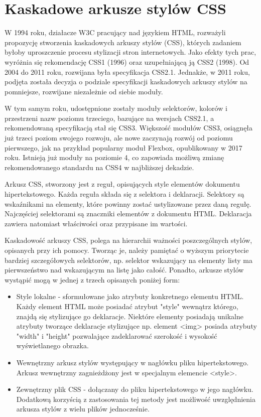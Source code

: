 \section{Kaskadowe arkusze stylów CSS}

W 1994 roku, działacze W3C pracujący nad językiem HTML, rozważyli propozycję stworzenia kaskadowych arkuszy stylów (CSS), których zadaniem byłoby uproszczenie procesu stylizacji stron internetowych. Jako efekty tych prac, wyróżnia się rekomendację CSS1 (1996) oraz uzupełniającą ją CSS2 (1998). Od 2004 do 2011 roku, rozwijana była specyfikacja CSS2.1. Jednakże, w 2011 roku, podjęta została decyzja o podziale specyfikacji kaskadowych arkuszy stylów na pomniejsze, rozwijane niezależnie od siebie moduły.

W tym samym roku, udostępnione zostały moduły selektorów, kolorów i przestrzeni nazw poziomu trzeciego, bazujące na wersjach CSS2.1, a rekomendowaną specyfikacją stał się CSS3. Większość modułów CSS3, osiągnęła już trzeci poziom swojego rozwoju, ale nowe zaczynają rozwój od poziomu pierwszego, jak na przykład popularny moduł Flexbox, opublikowany w 2017 roku. Istnieją już moduły na poziomie 4, co zapowiada możliwą zmianę rekomendowanego standardu na CSS4 w najbliższej dekadzie. 

Arkusz CSS, stworzony jest z reguł, opisujących style elementów dokumentu hipertekstowego. Każda reguła składa się z selektora i deklaracji. Selektory są wskaźnikami na elementy, które powinny zostać ustylizowane przez daną regułę. Najczęściej selektorami są znaczniki elementów z dokumentu HTML. Deklaracja zawiera natomiast właściwości oraz przypisane im wartości.

Kaskadowość arkuszy CSS, polega na hierarchii ważności poszczególnych stylów, opisanych przy ich pomocy. Tworząc je, należy pamiętać o wyższym priorytecie bardziej szczegółowych selektorów, np. selektor wskazujący na elementy listy ma pierwszeństwo nad wskazującym na listę jako całość. Ponadto, arkusze stylów wystąpić mogą w jednej z trzech opisanych poniżej form:

\begin{itemize}
    \item Style lokalne - sformułowane jako atrybuty konkretnego elementu HTML. Każdy element HTML może posiadać atrybut "style" wewnątrz którego, znajdą się stylizujące go deklaracje. Niektóre elementy posiadają unikalne atrybuty tworzące deklaracje stylizujące np. element <img> posiada atrybuty "width" i "height" pozwalające zadeklarować szerokość i wysokość wyświetlanego obrazka.
    \item Wewnętrzny arkusz stylów występujący w nagłówku pliku hipertekstowego. Arkusz wewnętrzny zagnieżdżony jest w specjalnym elemencie <style>.
    \item Zewnętrzny plik CSS - dołączany do pliku hipertekstowego w jego nagłówku. Dodatkową korzyścią z zastosowania tej metody jest możliwość uwzględnienia  arkusza stylów z wielu plików jednocześnie.
\end{itemize}

